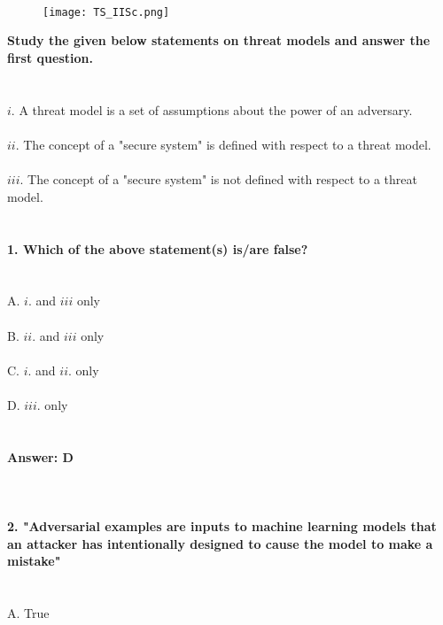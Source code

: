 \documentclass[prl,twocolumn,showpacs,preprintnumbers,superscriptaddress]{revtex4}
\theoremstyle{plain}
\theoremstyle{definition}
\begin{document}
\begin{widetext}
\\
\\
\\

\begin{wrapfigure}
\centering
\end{wrapfigure}
\begin{figure}[h!]
 \begin{right}
  \hfill\texttt{[image: TS\_IISc.png]}
 \end{right}
\end{figure}
\noindent\textbf{Study the given below statements on threat models and answer the first question.}
\\
\\
\\
$i.$ A threat model is a set of assumptions about the power of an adversary.
\\
\\
$ii.$ The concept of a "secure system" is defined with respect to a threat model.
\\
\\
$iii.$ The concept of a "secure system" is not defined with respect to a threat model.
\\
\\
\\
\textbf{1. Which of the above statement(s) is/are false?}
\\
\\
\\
\noindent A. $i.$ and $iii$ only
\\
\\
B. $ii.$ and $iii$ only
\\
\\
C. $i.$ and $ii.$ only
\\
\\
D. $iii.$ only
\\
\\
\\
\textbf{Answer: D}
\\
\\
\\
\\
\textbf{2. "Adversarial examples are inputs to machine learning models that an attacker has intentionally designed to cause the model to make a mistake"}
\\
\\
\\
\noindent A. True

\end{widetext}
\end{document}
